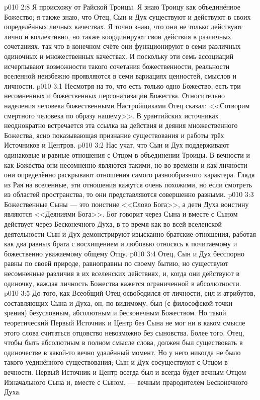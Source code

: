 \vs p010 2:8 Я происхожу от Райской Троицы. Я знаю Троицу как объединённое Божество; я также знаю, что Отец, Сын и Дух существуют и действуют в своих определённых личных качествах. Я точно знаю, что они не только действуют лично и коллективно, но также координируют свои действия в различных сочетаниях, так что в конечном счёте они функционируют в семи различных одиночных и множественных качествах. И поскольку эти семь ассоциаций исчерпывают возможности такого сочетания божественности, реальности вселенной неизбежно проявляются в семи вариациях ценностей, смыслов и личности.
\vs p010 3:1 Несмотря на то, что есть только одно Божество, есть три несомненных и божественных персонализации Божества. Относительно наделения человека божественными Настройщиками Отец сказал: <<Сотворим смертного человека по образу нашему>>. В урантийских источниках неоднократно встречается эта ссылка на действия и деяния множественного Божества, ясно показывающая признание существования и работы трёх Источников и Центров.
\vs p010 3:2 \pc Нас учат, что Сын и Дух поддерживают одинаковые и равные отношения с Отцом в объединении Троицы. В вечности и как Божества они несомненно являются такими, но во времени и как личности они определённо раскрывают отношения самого разнообразного характера. Глядя из Рая на вселенные, эти отношения кажутся очень похожими, но если смотреть из областей пространства, то они представляются совершенно разными.
\vs p010 3:3 Божественные Сыны --- это поистине <<Слово Бога>>, а дети Духа воистину являются <<Деяниями Бога>>. Бог говорит через Сына и вместе с Сыном действует через Бесконечного Духа, в то время как во всей вселенской деятельности Сын и Дух демонстрируют изысканно братские отношения, работая как два равных брата с восхищением и любовью относясь к почитаемому и божественно уважаемому общему Отцу.
\vs p010 3:4 Отец, Сын и Дух бесспорно равны по своей природе, равноправны по своему бытию, но существуют несомненные различия в их вселенских действиях, и, когда они действуют в одиночку, каждая личность Божества кажется ограниченной в абсолютности.
\vs p010 3:5 \pc До того, как Всеобщий Отец освободился от личности, сил и атрибутов, составляющих Сына и Духа, он, по\hyp{}видимому, был (с философской точки зрения) безусловным, абсолютным и бесконечным Божеством. Но такой теоретический Первый Источник и Центр без Сына не мог ни в каком смысле этого слова считаться  отцовство невозможно без сыновства. Более того, Отец, чтобы быть абсолютным в полном смысле слова, должен был существовать в одиночестве в какой\hyp{}то вечно удалённый момент. Но у него никогда не было такого уединённого существования; Сын и Дух сосуществуют с Отцом в вечности. Первый Источник и Центр всегда был и всегда будет вечным Отцом Изначального Сына и, вместе с Сыном, --- вечным прародителем Бесконечного Духа.
